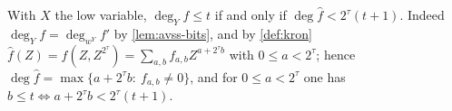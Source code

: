 \begin{remark}\label{rem:avss-y}
With $X$ the low variable, $\deg_Yf\le t$ if and only if $\deg\hat f<2^\tau(t+1)$. Indeed
$\deg_Yf=\deg_{w^Y}f'$ by \cref{lem:avss-bits}, and by \cref{def:kron}
$\hat f(Z)=f(Z,Z^{2^\tau})=\sum_{a,b}f_{a,b}Z^{a+2^\tau b}$ with $0\le a<2^\tau$; hence
$\deg\hat f=\max\{a+2^\tau b:\ f_{a,b}\ne0\}$, and for $0\le a<2^\tau$ one has
$b\le t\iff a+2^\tau b<2^\tau(t+1)$.
\end{remark}
